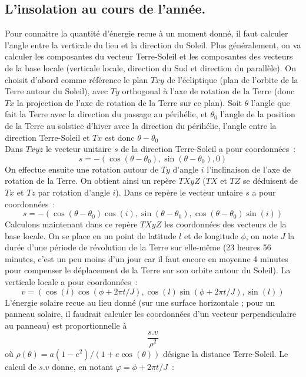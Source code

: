 \documentclass[a4paper,11pt]{article}
\begin{document}
\subsection{L'insolation au cours de l'ann\'ee.} 
Pour connaitre la quantit\'e d'\'energie recue \`a un moment
donn\'e, il faut calculer l'angle entre la verticale du lieu
et la direction du Soleil. Plus g\'en\'eralement, on va calculer
les composantes du vecteur Terre-Soleil et les composantes
des vecteurs de la base locale (verticale locale, direction du Sud et
direction du parall\`ele). On choisit d'abord comme r\'ef\'erence
le plan $Txy$ de l'\'ecliptique (plan de l'orbite de la Terre
autour du Soleil), avec $Ty$ orthogonal \`a l'axe de rotation 
de la Terre (donc $Tx$ la projection de l'axe de rotation
de la Terre sur ce plan). Soit $\theta$ l'angle que fait la Terre
avec la direction du passage au p\'erih\'elie, et $\theta_0$
l'angle de la position de la Terre au solstice d'hiver avec la
direction du p\'erih\'elie, l'angle entre la direction Terre-Soleil
et $Tx$ est donc $\theta-\theta_0$\\
Dans $Txyz$ le vecteur unitaire $s$
de la direction Terre-Soleil a pour coordonn\'ees~:
\[ s=-(\cos(\theta-\theta_0),\sin(\theta-\theta_0),0)\]
On effectue ensuite une rotation autour
de $Ty$ d'angle $i$ l'inclinaison de l'axe de rotation de la Terre.
On obtient ainsi un rep\`ere $TXyZ$ ($TX$ et $TZ$ se déduisent de 
$Tx$ et $Tz$ par rotation d'angle $i$). Dans ce repère 
le vecteur untaire $s$ a pour coordonnées~:
\[ s=-(\cos(\theta-\theta_0)\cos(i),\sin(\theta-\theta_0),
\cos(\theta-\theta_0)\sin(i)) \]
Calculons maintenant dans ce rep\`ere $TXyZ$ les coordonn\'ees
des vecteurs de la base locale. On se place en un point de latitude
$l$ et de longitude $\phi$, on note $J$ la dur\'ee d'une p\'eriode
de r\'evolution de la Terre sur elle-m\^eme (23 heures 56 minutes,
c'est un peu moins d'un jour car il faut encore en moyenne 4 minutes
pour compenser le d\'eplacement de la Terre sur son orbite autour
du Soleil). La verticale locale a pour coordonn\'ees~:
\[ v=(\cos(l)\cos(\phi+2\pi t/J),\cos(l)\sin(\phi+2\pi t/J),\sin(l))
\]
L'\'energie solaire recue au lieu donn\'e (sur une surface horizontale ;
pour un panneau solaire, il faudrait calculer les coordonn\'ees d'un vecteur
perpendiculaire au panneau) est proportionnelle \`a
\[ \frac{s.v}{\rho^2} \]
o\`u $\rho(\theta)=a(1-e^2)/(1+e\cos(\theta))$ 
d\'esigne la distance Terre-Soleil.
Le calcul de $s.v$ donne, en notant $\varphi=\phi+2\pi t/J$~:
\end{document}
